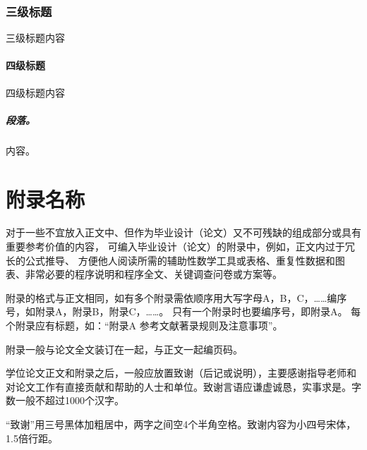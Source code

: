 \documentclass[fontset = mac ms]{seuthesis2024b}
\begin{document}
      \subsection{三级标题}
        三级标题内容
        \subsubsection{四级标题}
        四级标题内容
          \paragraph{段落。}内容。
    
  \chapterBib

  \appendix
  \chapter{附录名称}
    对于一些不宜放入正文中、但作为毕业设计（论文）又不可残缺的组成部分或具有重要参考价值的内容，
    可编入毕业设计（论文）的附录中，例如，正文内过于冗长的公式推导、
    方便他人阅读所需的辅助性数学工具或表格、重复性数据和图表、非常必要的程序说明和程序全文、关键调查问卷或方案等。

    附录的格式与正文相同，如有多个附录需依顺序用大写字母A，B，C，……编序号，如附录A，附录B，附录C，……。
    只有一个附录时也要编序号，即附录A。
    每个附录应有标题，如：“附录A 参考文献著录规则及注意事项”。

    附录一般与论文全文装订在一起，与正文一起编页码。
  
  \chapterAck
    学位论文正文和附录之后，一般应放置致谢（后记或说明），主要感谢指导老师和对论文工作有直接贡献和帮助的人士和单位。致谢言语应谦虚诚恳，实事求是。字数一般不超过1000个汉字。

    “致谢”用三号黑体加粗居中，两字之间空4个半角空格。致谢内容为小四号宋体，1.5倍行距。
  
\end{document}
